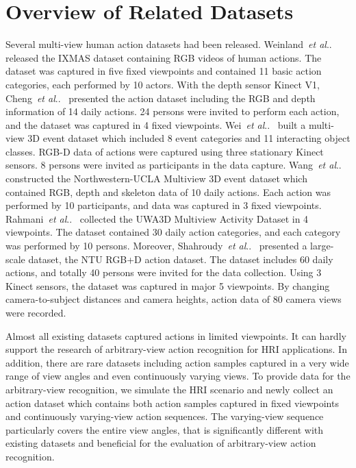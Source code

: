 \documentclass[journal]{IEEEtran}
\makeatletter
\DeclareRobustCommand\onedot{\futurelet\@let@token\@onedot}
\def\@onedot{\ifx\@let@token.\else.\null\fi\xspace}
\def\etal{\emph{et al}\onedot}
\makeatother
\begin{document}
\section{Overview of Related Datasets}
\label{sec:OverviewDatabase}
Several multi-view human action datasets had been released. Weinland~\etal~\cite{IXMAS2006} released the IXMAS dataset containing RGB videos of human actions. The dataset was captured in five fixed viewpoints and contained 11 basic action categories, each performed by 10 actors. With the depth sensor Kinect V1, Cheng~\etal~\cite{ChengACT42012} presented the  action dataset including the RGB and depth information of 14 daily actions. 24 persons were invited to perform each action, and the dataset was captured in 4 fixed viewpoints. Wei~\etal~\cite{Wei4DHOI2013} built a multi-view 3D event dataset which included 8 event categories and 11 interacting object classes. RGB-D data of actions were captured using three stationary Kinect sensors. 8 persons were invited as participants in the data capture. Wang~\etal~\cite{WangMSTAOG2014} constructed the Northwestern-UCLA Multiview 3D event dataset which contained RGB, depth and skeleton data of 10 daily actions. Each action was performed by 10 participants, and data was captured in 3 fixed viewpoints. Rahmani~\etal~\cite{RahmaniHOPC2014} collected the UWA3D Multiview Activity Dataset in 4 viewpoints. The dataset contained 30 daily action categories, and each category was performed by 10 persons. Moreover, Shahroudy~\etal~\cite{ShahroudyNTU2016} presented a large-scale dataset, the NTU RGB+D action dataset. The dataset includes 60 daily actions, and totally 40 persons were invited for the data collection. Using 3 Kinect sensors, the dataset was captured in major 5 viewpoints. By changing camera-to-subject distances and camera heights, action data of 80 camera views were recorded.

Almost all existing datasets captured actions in limited viewpoints. It can hardly support the research of arbitrary-view action recognition for HRI applications. In addition, there are rare datasets including action samples captured in a very wide range of view angles and even continuously varying views.
To provide data for the arbitrary-view recognition, we simulate the HRI scenario and newly collect an action dataset which contains both action samples captured in fixed viewpoints and continuously varying-view action sequences. The varying-view sequence particularly covers the entire  view angles, that is significantly different with existing datasets and beneficial for the evaluation of arbitrary-view action recognition.
\end{document}
